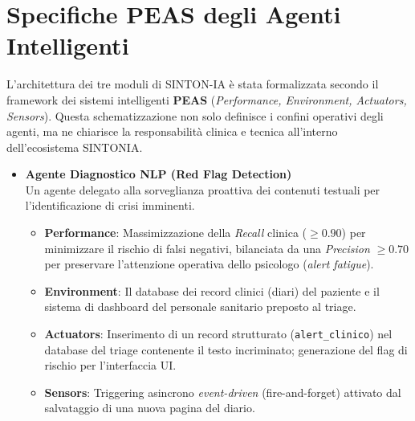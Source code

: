 \clearpage
\section{Specifiche PEAS degli Agenti Intelligenti}
\label{sec:peas_specifications}

L'architettura dei tre moduli di SINTON-IA è stata formalizzata secondo il framework dei sistemi intelligenti \textbf{PEAS} (\textit{Performance, Environment, Actuators, Sensors}). Questa schematizzazione non solo definisce i confini operativi degli agenti, ma ne chiarisce la responsabilità clinica e tecnica all'interno dell'ecosistema SINTONIA.

\begin{itemize}
    \item \textbf{Agente Diagnostico NLP (Red Flag Detection)} \\
          Un agente delegato alla sorveglianza proattiva dei contenuti testuali per l’identificazione di crisi imminenti.
          \begin{itemize}
              \item \textbf{Performance}: Massimizzazione della \textit{Recall} clinica ($\ge 0.90$) per minimizzare il rischio di falsi negativi, bilanciata da una \textit{Precision} $\ge 0.70$ per preservare l’attenzione operativa dello psicologo (\textit{alert fatigue}).
              \item \textbf{Environment}: Il database dei record clinici (diari) del paziente e il sistema di dashboard del personale sanitario preposto al triage.
              \item \textbf{Actuators}: Inserimento di un record strutturato (\texttt{alert\_clinico}) nel database del triage contenente il testo incriminato; generazione del flag di rischio per l'interfaccia UI.
              \item \textbf{Sensors}: Triggering asincrono \textit{event-driven} (fire-and-forget) attivato dal salvataggio di una nuova pagina del diario.
          \end{itemize}


\end{itemize}

